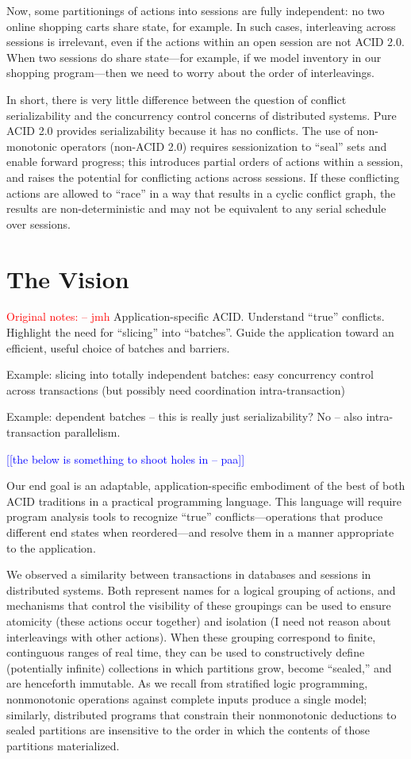 \documentclass{sig-alternate}
\newcommand{\jmh}[1]{{\textcolor{red}{#1 -- jmh}}}
\newcommand{\paa}[1]{{\textcolor{blue}{[[#1 -- paa]]}}}
\begin{document}
Now, some partitionings of actions into sessions are fully independent: no two
online shopping carts share state, for example.  In such cases, interleaving
across sessions is irrelevant, even if the actions within an open session are
not ACID 2.0.  When two sessions do share state---for example, if we model
inventory in our shopping program---then we need to worry about the order of
interleavings.

In short, there is very little difference between the question of conflict
serializability and the concurrency control concerns of distributed systems.
Pure ACID 2.0 provides serializability because it has no conflicts.  The use of
non-monotonic operators (non-ACID 2.0) requires sessionization to ``seal'' sets
and enable forward progress; this introduces partial orders of actions within a
session, and raises the potential for conflicting actions across sessions.  If
these conflicting actions are allowed to ``race'' in a way that results in a
cyclic conflict graph, the results are non-deterministic and may not be
equivalent to any serial schedule over sessions.


\section{The Vision}
\jmh{Original notes:}  
Application-specific ACID.  Understand ``true'' conflicts.  Highlight the need
for ``slicing'' into ``batches''.  Guide the application toward an efficient,
useful choice of batches and barriers.

Example: slicing into totally independent batches: easy concurrency control
across transactions (but possibly need coordination intra-transaction)

Example: dependent batches -- this is really just serializability?  No -- also
intra-transaction parallelism.

\paa{the below is something to shoot holes in}

Our end goal is an adaptable, application-specific embodiment of the best of both ACID traditions in a practical programming language. This language will require program analysis tools to recognize ``true'' conflicts---operations that produce different end states when reordered---and resolve them in a manner appropriate to the application.

We observed a similarity between transactions in databases and sessions in distributed systems.  Both represent names for a logical grouping of actions, and mechanisms that control the visibility of these groupings can be used to ensure atomicity (these actions occur together) and isolation (I need not reason about interleavings with other actions).  When these grouping correspond to finite, continguous ranges of real time, they can be used to constructively define (potentially infinite) collections in which partitions grow, become ``sealed,'' and are henceforth immutable.  As we recall from stratified logic programming, nonmonotonic operations against complete inputs produce a single model; similarly, distributed programs that constrain their nonmonotonic deductions to sealed partitions are insensitive to the order in which the contents of those partitions materialized.
 
\end{document}
